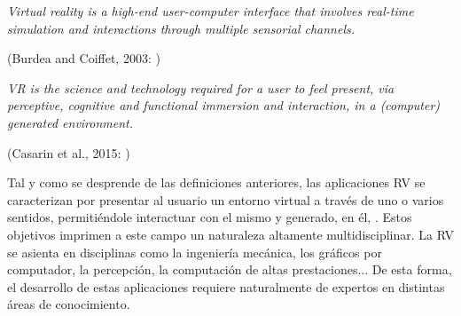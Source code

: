\begin{center}
    \begin{minipage}{0.9\linewidth}
        {\small
\emph{Virtual reality is a high-end user-computer interface that
involves real-time simulation and interactions through
multiple sensorial channels.}
        }
        \begin{flushright}
            (Burdea and Coiffet, 2003: \cite{burdea2003virtual})
        \end{flushright}
    \end{minipage}
    
    \begin{minipage}{0.9\linewidth}
        {\small
\emph{VR is the science and technology required for a user
to feel present, via perceptive, cognitive and functional
immersion and interaction, in a (computer) generated
environment. }
        }
        \begin{flushright}
            (Casarin et al., 2015: \cite{kuntz2015middlevr})
        \end{flushright}
    \end{minipage}
    
\end{center}
%
Tal y como se desprende de las definiciones anteriores, las aplicaciones \ac{RV} se caracterizan por presentar al usuario un entorno virtual a través de uno o varios sentidos, permitiéndole interactuar con el mismo y generado, en él, . Estos objetivos imprimen a este campo un naturaleza altamente multidisciplinar. La \ac{RV} se asienta en disciplinas como la ingeniería mecánica, los gráficos por computador, la percepción, la computación de altas prestaciones... De esta forma, el desarrollo de estas aplicaciones requiere naturalmente de expertos en distintas áreas de conocimiento.  

